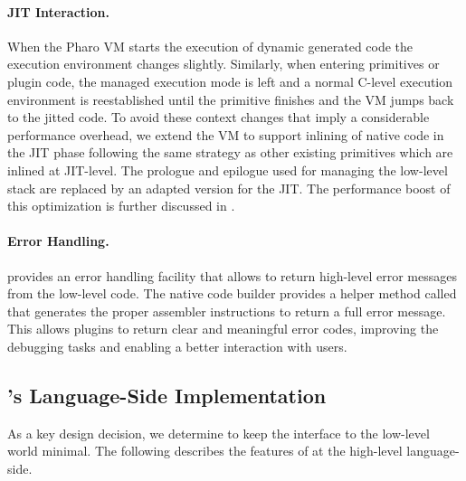 \paragraph{JIT Interaction.}

When the Pharo VM starts the execution of dynamic generated code the execution environment changes slightly.
Similarly, when entering primitives or plugin code, the managed execution mode is left and a normal C-level execution environment is reestablished until the primitive finishes and the VM jumps back to the jitted code. 
To avoid these context changes that imply a considerable performance overhead, we extend the VM to support inlining of native code in the JIT phase following the same strategy as other existing primitives which are inlined at JIT-level.
The \B prologue and epilogue used for managing the low-level stack are replaced by an adapted version for the JIT.
The performance boost of this optimization is further discussed in .

\paragraph{Error Handling.}


\B provides an error handling facility that allows to return high-level error messages from the low-level code. 
The native code builder provides a helper method called  
that generates the proper assembler instructions to return a full error message.
This allows plugins to return clear and meaningful error codes, improving the debugging tasks and enabling a better interaction with users.

\subsection{\B's Language-Side Implementation}
As a key design decision, we determine to keep the interface to the low-level world minimal.
The following describes the features of \B at the high-level language-side.

